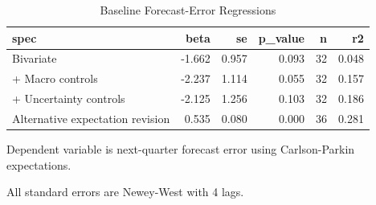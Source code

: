 \begin{table}[!htbp]
\centering
\caption{Baseline Forecast-Error Regressions}
\label{tab:ols_baseline}
\begin{threeparttable}

\begin{tabular}{lrrrrr}
\toprule
spec & beta & se & p\_value & n & r2\\
\midrule
Bivariate & -1.662 & 0.957 & 0.093 & 32 & 0.048\\
+ Macro controls & -2.237 & 1.114 & 0.055 & 32 & 0.157\\
+ Uncertainty controls & -2.125 & 1.256 & 0.103 & 32 & 0.186\\
Alternative expectation revision & 0.535 & 0.080 & 0.000 & 36 & 0.281\\
\bottomrule
\end{tabular}
\begin{tablenotes}[flushleft]
\footnotesize
\item Dependent variable is next-quarter forecast error using Carlson-Parkin expectations.
\item All standard errors are Newey-West with 4 lags.
\end{tablenotes}
\end{threeparttable}
\end{table}
